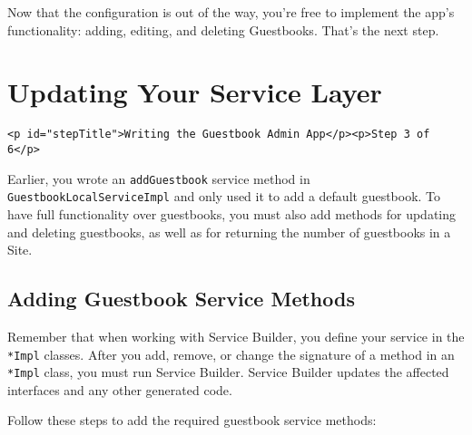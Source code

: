 Now that the configuration is out of the way, you're free to implement
the app's functionality: adding, editing, and deleting Guestbooks.
That's the next step.

\chapter{Updating Your Service Layer}\label{updating-your-service-layer}

\begin{verbatim}
<p id="stepTitle">Writing the Guestbook Admin App</p><p>Step 3 of 6</p>
\end{verbatim}

Earlier, you wrote an \texttt{addGuestbook} service method in
\texttt{GuestbookLocalServiceImpl} and only used it to add a default
guestbook. To have full functionality over guestbooks, you must also add
methods for updating and deleting guestbooks, as well as for returning
the number of guestbooks in a Site.

\section{Adding Guestbook Service
Methods}\label{adding-guestbook-service-methods}

Remember that when working with Service Builder, you define your service
in the \texttt{*Impl} classes. After you add, remove, or change the
signature of a method in an \texttt{*Impl} class, you must run Service
Builder. Service Builder updates the affected interfaces and any other
generated code.

Follow these steps to add the required guestbook service methods:

